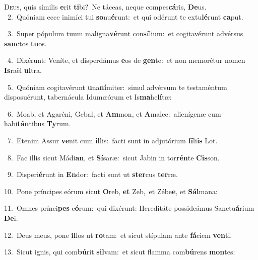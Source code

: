 \lettrine{\initial\textcolor{\initialcolor}{D}}{eus,} quis símilis \textbf{e}\-rit \textbf{ti}\-bi?~\star Ne táceas, neque compes\-\textbf{cá}\-ris, \textbf{De}\-us.\\
{\numbfont\textcolor{\numbcolor}{~2.}}~Quóniam ecce inimíci tui \textbf{so}\-nu\-\textbf{é}\-runt:~\star et qui odérunt te extu\-\textbf{lé}\-runt \textbf{ca}\-put.\par
{\numbfont\textcolor{\numbcolor}{~3.}}~Super pópulum tuum maligna\-\textbf{vé}\-runt con\-\textbf{sí}\-lium:~\star et cogitavérunt advérsus \textbf{sanc}\-tos \textbf{tu}\-os.\par
{\numbfont\textcolor{\numbcolor}{~4.}}~Dixérunt: Veníte, et disperdámus \textbf{e}\-os de \textbf{gen}\-te:~\star et non memorétur nomen \textbf{Is}\-raël \textbf{ul}\-tra.\par
{\numbfont\textcolor{\numbcolor}{~5.}}~Quóniam cogitavérunt \textbf{u}\-na\-\textbf{ní}\-miter:~\star simul advérsum te testaméntum disposuérunt, tabernácula Idumæórum et Is\-\textbf{ma}\-he\-\textbf{lí}\-tæ:\par
{\numbfont\textcolor{\numbcolor}{~6.}}~Moab, et Agaréni, Gebal, et \textbf{Am}\-mon, et \textbf{A}\-malec:~\star alienígenæ cum habi\-\textbf{tán}\-tibus \textbf{Ty}\-rum.\par
{\numbfont\textcolor{\numbcolor}{~7.}}~Etenim Assur \textbf{ve}\-nit cum \textbf{il}\-lis:~\star facti sunt in adjutórium \textbf{fí}\-li\textbf{is} Lot.\par
{\numbfont\textcolor{\numbcolor}{~8.}}~Fac illis sicut Mádi\-\textbf{an}\-, et \textbf{Sí}\-saræ:~\star sicut Jabin in tor\-\textbf{rén}\-te \textbf{Cis}\-son.\par
{\numbfont\textcolor{\numbcolor}{~9.}}~Disperi\-\textbf{é}\-runt in \textbf{En}\-dor:~\star facti sunt ut \textbf{ster}\-cus \textbf{ter}\-ræ.\par
{\numbfont\textcolor{\numbcolor}{10.}}~Pone príncipes eórum sicut \textbf{O}\-reb, \textbf{et} Zeb,~\star et Zébe\-\textbf{e}\-, et \textbf{Sál}\-mana:\par
{\numbfont\textcolor{\numbcolor}{11.}}~Omnes prínci\textbf{pes} e\-\textbf{ó}\-rum:~\star qui dixérunt: Hereditáte possideámus Sanctu\-\textbf{á}\-rium \textbf{De}\-i.\par
{\numbfont\textcolor{\numbcolor}{12.}}~Deus meus, pone \textbf{il}\-los ut \textbf{ro}\-tam:~\star et sicut stípulam ante \textbf{fá}\-ciem \textbf{ven}\-ti.\par
{\numbfont\textcolor{\numbcolor}{13.}}~Sicut ignis, qui com\-\textbf{bú}\-rit \textbf{sil}\-vam:~\star et sicut flamma com\-\textbf{bú}\-rens \textbf{mon}\-tes:\par
